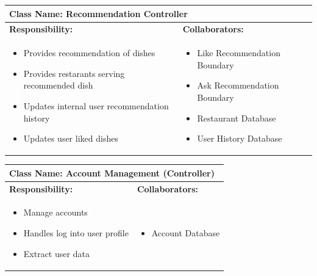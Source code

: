 \documentclass[]{article}
\begin{document}

\begin{table}[H]
	\centering
	\begin{tabular}{|p{7cm}|p{7cm}|}
	\hline 
	 \multicolumn{2}{|l|}{\textbf{Class Name: Recommendation Controller}} \\
	\hline
	\textbf{Responsibility:} & \textbf{Collaborators:} \\
	\hline
	\raggedright
	\begin{itemize}
		\item Provides recommendation of dishes
		\item Provides restarants serving recommended dish
		\item Updates internal user recommendation history
		\item Updates user liked dishes
	\end{itemize}
	\vspace{1in} & 
	\begin{itemize}
		\item Like Recommendation Boundary
		\item Ask Recommendation Boundary
		\item Restaurant Database
		\item User History Database
	\end{itemize} \\
	\hline
	\end{tabular}
\end{table}

\begin{table}[H]
	\centering
	\begin{tabular}{|p{7cm}|p{7cm}|}
	\hline 
	 \multicolumn{2}{|l|}{\textbf{Class Name: Account Management (Controller)}} \\
	\hline
	\textbf{Responsibility:} & \textbf{Collaborators:} \\
	\hline
	\raggedright
	\begin{itemize}
		\item Manage accounts
		\item Handles log into user profile
		\item Extract user data
	\end{itemize}
	\vspace{1in} & 
	\begin{itemize}
		\item Account Database
	\end{itemize} \\
	\hline
	\end{tabular}
\end{table}
\end{document}
